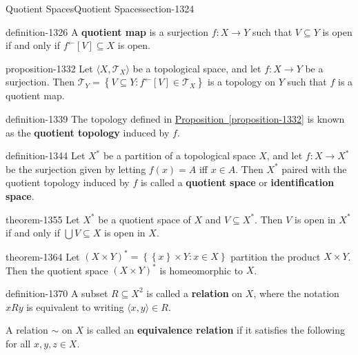 \documentclass[oneside,10pt,]{article}
\newcommand{\terminology}[1]{\textbf{#1}}
\newcommand{\tuple}[1]{\langle #1 \rangle}
\newcommand{\mc}{\mathcal}
\newcommand{\setBuilder}[2]{\left\{#1:#2\right\}}
\newcommand{\setList}[1]{\left\{#1\right\}}
\begin{document}
\typeout{************************************************}
%
\begin{sectionptx}{Quotient Spaces}{}{Quotient Spaces}{}{}{section-1324}
\begin{definition}{}{definition-1326}%
\hypertarget{p-1327}{}%
A \terminology{quotient map} is a surjection \(f:X\to Y\) such that \(V\subseteq Y\) is open if and only if \(f^\leftarrow[V]\subseteq X\) is open.%
\end{definition}
\begin{proposition}{}{}{proposition-1332}%
\hypertarget{p-1333}{}%
Let \(\tuple{X,\mc T_X}\) be a topological space, and let \(f:X\to Y\) be a surjection. Then \(\mc T_Y=\setBuilder{V\subseteq Y}{f^\leftarrow[V]\in\mc T_X}\) is a topology on \(Y\) such that \(f\) is a quotient map.%
\end{proposition}
\begin{definition}{}{definition-1339}%
\hypertarget{p-1340}{}%
The topology defined in \hyperref[proposition-1332]{Proposition~\ref{proposition-1332}} is known as the \terminology{quotient topology} induced by \(f\).%
\end{definition}
\begin{definition}{}{definition-1344}%
\hypertarget{p-1345}{}%
Let \(X^*\) be a partition of a topological space \(X\), and let \(f:X\to X^*\) be the surjection given by letting \(f(x)=A\) iff \(x\in A\). Then \(X^*\) paired with the quotient topology induced by \(f\) is called a \terminology{quotient space} or \terminology{identification space}.%
\end{definition}
\begin{theorem}{}{}{theorem-1355}%
\hypertarget{p-1356}{}%
Let \(X^*\) be a quotient space of \(X\) and \(V\subseteq X^*\). Then \(V\) is open in \(X^*\) if and only if \(\bigcup V\subseteq X\) is open in \(X\).%
\end{theorem}
\begin{theorem}{}{}{theorem-1364}%
\hypertarget{p-1365}{}%
Let \((X\times Y)^*=\setBuilder{\setList{x}\times Y}{x\in X}\) partition the product \(X\times Y\). Then the quotient space \((X\times Y)^*\) is homeomorphic to \(X\).%
\end{theorem}
\begin{definition}{}{definition-1370}%
\hypertarget{p-1371}{}%
A subset \(R\subseteq X^2\) is called a \terminology{relation} on \(X\), where the notation \(xRy\) is equivalent to writing \(\tuple{x,y}\in R\).%
\par
\hypertarget{p-1377}{}%
A relation \(\sim\) on \(X\) is called an \terminology{equivalence relation} if it satisfies the following for all \(x,y,z\in X\).%

\end{definition}
\end{sectionptx}
\end{document}
